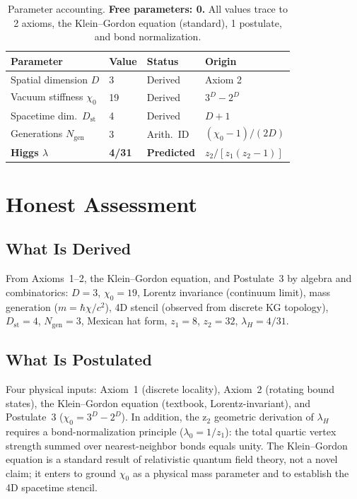 \documentclass[12pt,a4paper]{article}
\newcommand{\chizero}{\chi_0}
\newcommand{\Dst}{D_{\mathrm{st}}}
\newcommand{\Ngen}{N_{\mathrm{gen}}}
\begin{document}
\begin{table}[h]
\centering
\begin{tabular}{llll}
\toprule
Parameter & Value & Status & Origin \\
\midrule
Spatial dimension $D$ & 3 & Derived & Axiom 2 \\
Vacuum stiffness $\chizero$ & 19 & Derived & $3^D - 2^D$ \\
Spacetime dim.\ $\Dst$ & 4 & Derived & $D + 1$ \\
Generations $\Ngen$ & 3 & Arith.\ ID & $(\chizero-1)/(2D)$ \\
\textbf{Higgs $\lambda$} & \textbf{4/31} & \textbf{Predicted} & $z_2/[z_1(z_2-1)]$ \\
\bottomrule
\end{tabular}
\caption{Parameter accounting. \textbf{Free parameters: 0.} All values trace to 2 axioms, the Klein--Gordon equation (standard), 1 postulate, and bond normalization.}
\label{tab:params}
\end{table}


\section{Honest Assessment}\label{sec:honest}

\subsection{What Is Derived}

From Axioms~1--2, the Klein--Gordon equation, and Postulate~3 by algebra and combinatorics: $D = 3$, $\chizero = 19$, Lorentz invariance (continuum limit), mass generation ($m = \hbar\chi/c^2$), 4D stencil (observed from discrete KG topology), $\Dst = 4$, $\Ngen = 3$, Mexican hat form, $z_1 = 8$, $z_2 = 32$, $\lambda_H = 4/31$.

\subsection{What Is Postulated}

Four physical inputs: Axiom~1 (discrete locality), Axiom~2 (rotating bound states), the Klein--Gordon equation (textbook, Lorentz-invariant), and Postulate~3 ($\chizero = 3^D - 2^D$). In addition, the z$_2$ geometric derivation of $\lambda_H$ requires a bond-normalization principle ($\lambda_0 = 1/z_1$): the total quartic vertex strength summed over nearest-neighbor bonds equals unity. The Klein--Gordon equation is a standard result of relativistic quantum field theory, not a novel claim; it enters to ground $\chizero$ as a physical mass parameter and to establish the 4D spacetime stencil.
\end{document}
